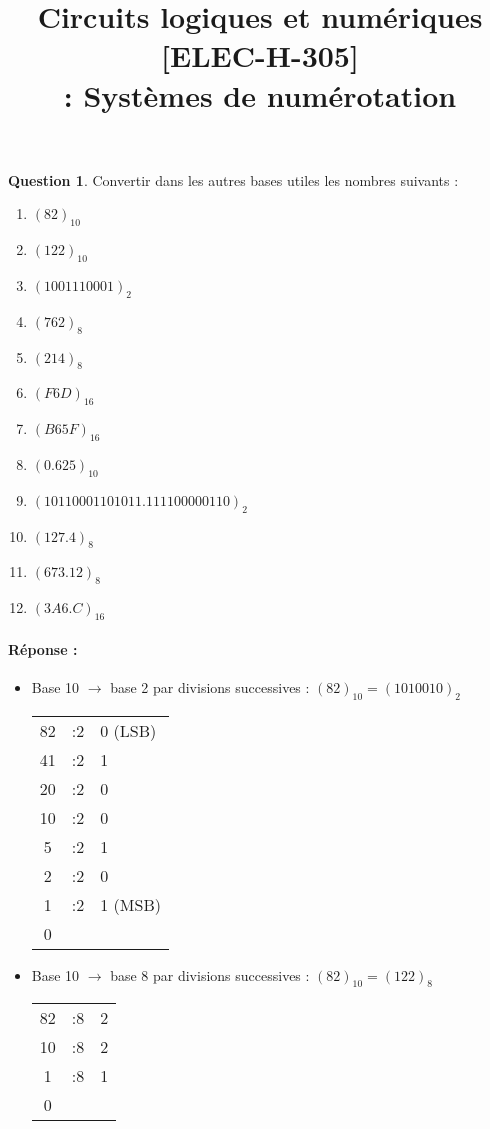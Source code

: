 \documentclass[11pt,a4paper]{article}
\date{}
\title{\vspace{-2cm}Circuits logiques et numériques [ELEC-H-305] \\  \tpnumber : Systèmes de numérotation \ifthenelse{\boolean{corrige}}{-- Corrigé}{} \\ \small{\version}}
\theoremstyle{definition}%
\newtheorem{Q}{Question}[] %
\newcommand{\reponse}[1]{%
	\ifthenelse {\boolean{corrige}} {\paragraph{Réponse :} \color{darkblue}   #1\color{black}} {}
 }
\begin{document}
\maketitle
\vspace*{-1cm}

\begin{Q}
	Convertir dans les autres bases utiles les nombres suivants :
	\begin{enumerate}
	\item $(82)_{10}$
	\item $(122)_{10}$
	\item $(1001110001)_2$
	\item $(762)_8$
	\item $(214)_8$
	\item $(F6D)_{16}$
	\item $(B65F)_{16}$
	\item $(0.625)_{10}$
	\item $(10110001101011.111100000110)_2$
	\item $(127.4)_8$
	\item $(673.12)_8$
	\item $(3A6.C)_{16}$
	\end{enumerate}

	\reponse{
	\begin{itemize}
		\item Base 10 $\rightarrow$ base 2 par divisions successives : $(82)_{10} = (1010010)_2$

			\begin{tabular}{c|c|l}
			82 & :2 & 0 (LSB)\\
			41 & :2 & 1 \\
			20 & :2 & 0 \\
			10 & :2 & 0 \\
			5  & :2 & 1 \\
			2  & :2 & 0 \\
			1  & :2 & 1 (MSB)\\
			0  &    &   \\
			\end{tabular}
		\item Base 10 $\rightarrow$ base 8 par divisions successives : $(82)_{10} = (122)_8$

			\begin{tabular}{c|c|c}
			82 & :8 & 2 \\
			10 & :8 & 2 \\
			1  & :8 & 1 \\
			0  &    &   \\
			\end{tabular}


\end{itemize}}
\end{Q}
\end{document}
